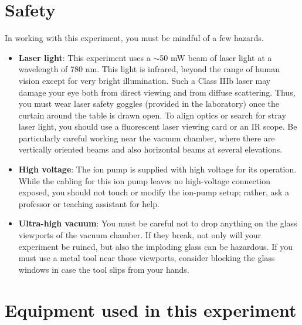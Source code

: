 \documentclass{../lab}
\begin{document}
\section{Safety}

In working with this experiment, you must be mindful of a few hazards.

\begin{itemize}
    \item \textbf{Laser light}: This experiment uses a $\sim$50 mW beam of laser light at a wavelength of 780 nm. This light is infrared, beyond the range of human vision except for very bright illumination. Such a Class IIIb laser may damage your eye both from direct viewing and from diffuse scattering. Thus, you must wear laser safety goggles (provided in the laboratory) once the curtain around the table is drawn open. To align optics or search for stray laser light, you should use a fluorescent laser viewing card or an IR scope. Be particularly careful working near the vacuum chamber, where there are vertically oriented beams and also horizontal beams at several elevations.

    \item \textbf{High voltage}: The ion pump is supplied with high voltage for its operation. While the cabling for this ion pump leaves no high-voltage connection exposed, you should not touch or modify the ion-pump setup; rather, ask a professor or teaching assistant for help.

    \item \textbf{Ultra-high vacuum}: You must be careful not to drop anything on the glass viewports of the vacuum chamber. If they break, not only will your experiment be ruined, but also the imploding glass can be hazardous. If you must use a metal tool near those viewports, consider blocking the glass windows in case the tool slips from your hands.
\end{itemize}

\section{Equipment used in this experiment}
\end{document}
